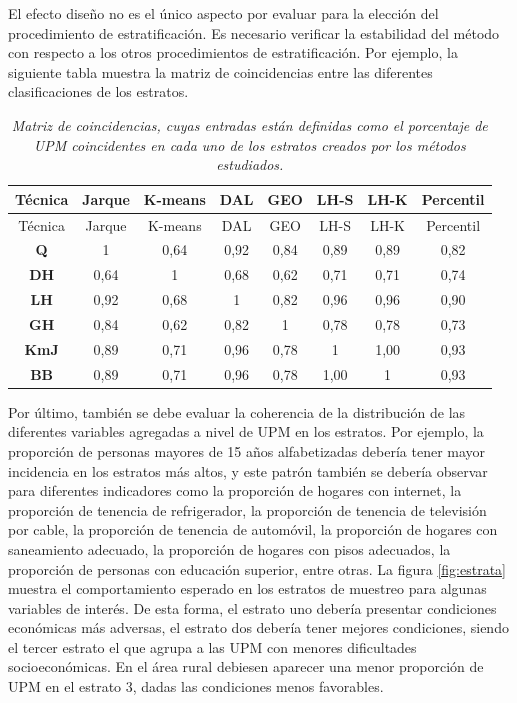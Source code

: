 \documentclass[
  12pt,
  spanish,
]{book}
\begin{document}
El efecto diseño no es el único aspecto por evaluar para la elección del procedimiento de estratificación. Es necesario verificar la estabilidad del método con respecto a los otros procedimientos de estratificación. Por ejemplo, la siguiente tabla muestra la matriz de coincidencias entre las diferentes clasificaciones de los estratos.

\begin{longtable}[]{@{}cccccccc@{}}
\caption{\emph{Matriz de coincidencias, cuyas entradas están definidas como el porcentaje de UPM coincidentes en cada uno de los estratos creados por los métodos estudiados.}}\tabularnewline
\toprule
Técnica & Jarque & K-means & DAL & GEO & LH-S & LH-K & Percentil \\
\midrule
\endfirsthead
\toprule
Técnica & Jarque & K-means & DAL & GEO & LH-S & LH-K & Percentil \\
\midrule
\endhead
\textbf{Q} & 1 & 0,64 & 0,92 & 0,84 & 0,89 & 0,89 & 0,82 \\
\textbf{DH} & 0,64 & 1 & 0,68 & 0,62 & 0,71 & 0,71 & 0,74 \\
\textbf{LH} & 0,92 & 0,68 & 1 & 0,82 & 0,96 & 0,96 & 0,90 \\
\textbf{GH} & 0,84 & 0,62 & 0,82 & 1 & 0,78 & 0,78 & 0,73 \\
\textbf{KmJ} & 0,89 & 0,71 & 0,96 & 0,78 & 1 & 1,00 & 0,93 \\
\textbf{BB} & 0,89 & 0,71 & 0,96 & 0,78 & 1,00 & 1 & 0,93 \\
\bottomrule
\end{longtable}

Por último, también se debe evaluar la coherencia de la distribución de las diferentes variables agregadas a nivel de UPM en los estratos. Por ejemplo, la proporción de personas mayores de 15 años alfabetizadas debería tener mayor incidencia en los estratos más altos, y este patrón también se debería observar para diferentes indicadores como la proporción de hogares con internet, la proporción de tenencia de refrigerador, la proporción de tenencia de televisión por cable, la proporción de tenencia de automóvil, la proporción de hogares con saneamiento adecuado, la proporción de hogares con pisos adecuados, la proporción de personas con educación superior, entre otras. La figura \ref{fig:estrata} muestra el comportamiento esperado en los estratos de muestreo para algunas variables de interés. De esta forma, el estrato uno debería presentar condiciones económicas más adversas, el estrato dos debería tener mejores condiciones, siendo el tercer estrato el que agrupa a las UPM con menores dificultades socioeconómicas. En el área rural debiesen aparecer una menor proporción de UPM en el estrato 3, dadas las condiciones menos favorables.
\end{document}
